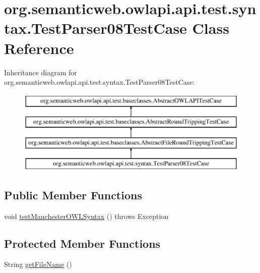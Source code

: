 \hypertarget{classorg_1_1semanticweb_1_1owlapi_1_1api_1_1test_1_1syntax_1_1_test_parser08_test_case}{\section{org.\-semanticweb.\-owlapi.\-api.\-test.\-syntax.\-Test\-Parser08\-Test\-Case Class Reference}
\label{classorg_1_1semanticweb_1_1owlapi_1_1api_1_1test_1_1syntax_1_1_test_parser08_test_case}
}
Inheritance diagram for org.\-semanticweb.\-owlapi.\-api.\-test.\-syntax.\-Test\-Parser08\-Test\-Case\-:\begin{figure}[H]
\begin{center}
\leavevmode
\includegraphics[height=4.000000cm]{classorg_1_1semanticweb_1_1owlapi_1_1api_1_1test_1_1syntax_1_1_test_parser08_test_case}
\end{center}
\end{figure}
\subsection*{Public Member Functions}
\begin{DoxyCompactItemize}
\item 
void \hyperlink{classorg_1_1semanticweb_1_1owlapi_1_1api_1_1test_1_1syntax_1_1_test_parser08_test_case_aae8112d036b618ea587bfc08884c886c}{test\-Manchester\-O\-W\-L\-Syntax} ()  throws Exception 
\end{DoxyCompactItemize}
\subsection*{Protected Member Functions}
\begin{DoxyCompactItemize}
\item 
String \hyperlink{classorg_1_1semanticweb_1_1owlapi_1_1api_1_1test_1_1syntax_1_1_test_parser08_test_case_a3e0b22aa02b10d86e4045c6e61fcb309}{get\-File\-Name} ()
\end{DoxyCompactItemize}


